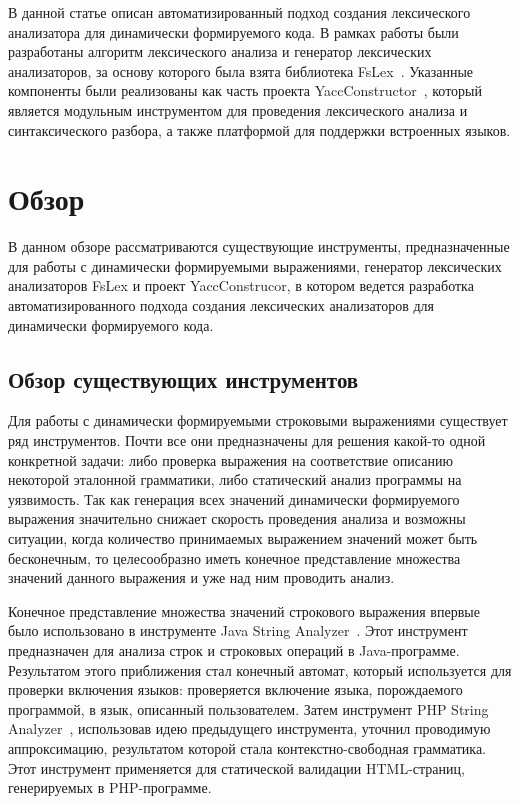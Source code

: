 \documentclass[10pt, conference, compsocconf]{IEEEtran}
\begin{document}
В данной статье описан автоматизированный подход создания лексического анализатора для динамически формируемого кода. В рамках работы были разработаны алгоритм лексического анализа и генератор лексических анализаторов,  за основу которого была взята библиотека FsLex~\cite{FsLex}. Указанные компоненты были реализованы как часть проекта  YaccConstructor~\cite{YC_article}, который является модульным инструментом для проведения лексического анализа и синтаксического разбора, а также платформой для поддержки встроенных языков.


\section{Обзор}

В данном обзоре рассматриваются существующие инструменты, предназначенные для работы с динамически формируемыми выражениями, генератор лексических анализаторов FsLex и проект YaccConstrucor, в котором ведется разработка автоматизированного подхода создания лексических анализаторов для динамически формируемого кода. 


\subsection{Обзор существующих инструментов}

Для работы с динамически формируемыми строковыми выражениями существует ряд инструментов. Почти все они предназначены для решения какой-то одной конкретной задачи: либо проверка выражения на соответствие описанию некоторой эталонной грамматики,  либо статический анализ программы на уязвимость. Так как генерация всех значений динамически формируемого выражения значительно снижает скорость проведения анализа и возможны ситуации, когда количество принимаемых выражением значений может быть бесконечным, то  целесообразно иметь конечное представление множества значений данного выражения и уже над ним проводить анализ. 

Конечное представление множества значений строкового выражения впервые было использовано в инструменте Java String Analyzer~\cite{JSA}. Этот инструмент предназначен для анализа строк и строковых операций в Java-программе. Результатом этого приближения стал конечный автомат, который используется для проверки включения языков: проверяется включение языка, порождаемого программой, в язык, описанный пользователем. Затем инструмент PHP String Analyzer~\cite{PHPSA}, использовав идею предыдущего инструмента, уточнил проводимую аппроксимацию, результатом которой стала контекстно-свободная грамматика. Этот инструмент применяется для статической валидации HTML-страниц, генерируемых в PHP-программе. 
\end{document}
